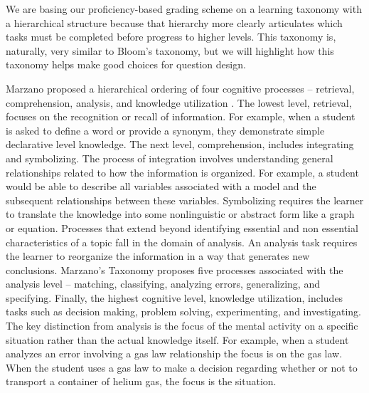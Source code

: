 \documentclass[10pt,letterpaper]{article}
\begin{document}
 We are basing our  proficiency-based grading scheme on a learning taxonomy with a hierarchical structure because that hierarchy more clearly articulates which tasks must be completed before progress to higher levels. This taxonomy is, naturally, very similar to Bloom's taxonomy, but we will highlight how this taxonomy helps make good choices for question design.

Marzano proposed a hierarchical ordering of four cognitive processes -- retrieval, comprehension, analysis, and knowledge utilization \citep{Marzano2006}. The lowest level, retrieval, focuses on the recognition or recall of information. For example, when a student is asked to define a word or provide a synonym, they demonstrate simple declarative level knowledge. The next level, comprehension, includes integrating and symbolizing. The process of integration involves understanding general relationships related to how the information is organized. For example, a student would be able to describe all variables associated with a model and the subsequent relationships between these variables. Symbolizing requires the learner to translate the knowledge into some nonlinguistic or abstract form like a graph or equation. Processes that extend beyond identifying essential and non essential characteristics of a topic fall in the domain of analysis. An analysis task requires the learner to reorganize the information in a way that generates new conclusions. Marzano's Taxonomy proposes five processes associated with the analysis level -- matching, classifying, analyzing errors, generalizing, and specifying. Finally, the highest cognitive level, knowledge utilization, includes tasks such as decision making, problem solving, experimenting, and investigating. The key distinction from analysis is the focus of the mental activity on a specific situation rather than the actual knowledge itself. For example, when a student analyzes an error involving a gas law relationship the focus is on the gas law. When the student uses a gas law to make a decision regarding whether or not to transport a container of helium gas, the focus is the situation. 

\end{document}
